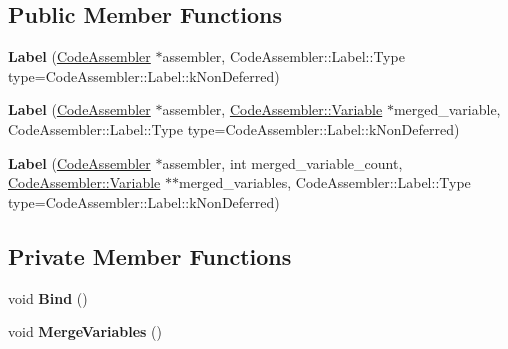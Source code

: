 \subsection*{Public Member Functions}
\begin{DoxyCompactItemize}
\item 
{\bfseries Label} (\hyperlink{classv8_1_1internal_1_1compiler_1_1_code_assembler}{Code\+Assembler} $\ast$assembler, Code\+Assembler\+::\+Label\+::\+Type type=Code\+Assembler\+::\+Label\+::k\+Non\+Deferred)\hypertarget{classv8_1_1internal_1_1compiler_1_1_code_assembler_1_1_label_a8fd82c2ad21e2e986fa1368cd00772fb}{}\label{classv8_1_1internal_1_1compiler_1_1_code_assembler_1_1_label_a8fd82c2ad21e2e986fa1368cd00772fb}

\item 
{\bfseries Label} (\hyperlink{classv8_1_1internal_1_1compiler_1_1_code_assembler}{Code\+Assembler} $\ast$assembler, \hyperlink{classv8_1_1internal_1_1compiler_1_1_code_assembler_1_1_variable}{Code\+Assembler\+::\+Variable} $\ast$merged\+\_\+variable, Code\+Assembler\+::\+Label\+::\+Type type=Code\+Assembler\+::\+Label\+::k\+Non\+Deferred)\hypertarget{classv8_1_1internal_1_1compiler_1_1_code_assembler_1_1_label_aef5c5c088e5c71f23fc0df8e3cffb084}{}\label{classv8_1_1internal_1_1compiler_1_1_code_assembler_1_1_label_aef5c5c088e5c71f23fc0df8e3cffb084}

\item 
{\bfseries Label} (\hyperlink{classv8_1_1internal_1_1compiler_1_1_code_assembler}{Code\+Assembler} $\ast$assembler, int merged\+\_\+variable\+\_\+count, \hyperlink{classv8_1_1internal_1_1compiler_1_1_code_assembler_1_1_variable}{Code\+Assembler\+::\+Variable} $\ast$$\ast$merged\+\_\+variables, Code\+Assembler\+::\+Label\+::\+Type type=Code\+Assembler\+::\+Label\+::k\+Non\+Deferred)\hypertarget{classv8_1_1internal_1_1compiler_1_1_code_assembler_1_1_label_aacda3ddf65300e0d5ab42f764f76a6a7}{}\label{classv8_1_1internal_1_1compiler_1_1_code_assembler_1_1_label_aacda3ddf65300e0d5ab42f764f76a6a7}

\end{DoxyCompactItemize}
\subsection*{Private Member Functions}
\begin{DoxyCompactItemize}
\item 
void {\bfseries Bind} ()\hypertarget{classv8_1_1internal_1_1compiler_1_1_code_assembler_1_1_label_a40f0a83471c1a8e843638fcc46d81ae3}{}\label{classv8_1_1internal_1_1compiler_1_1_code_assembler_1_1_label_a40f0a83471c1a8e843638fcc46d81ae3}

\item 
void {\bfseries Merge\+Variables} ()\hypertarget{classv8_1_1internal_1_1compiler_1_1_code_assembler_1_1_label_a7611f79b48b704c9f033429f7a0480be}{}\label{classv8_1_1internal_1_1compiler_1_1_code_assembler_1_1_label_a7611f79b48b704c9f033429f7a0480be}

\end{DoxyCompactItemize}
